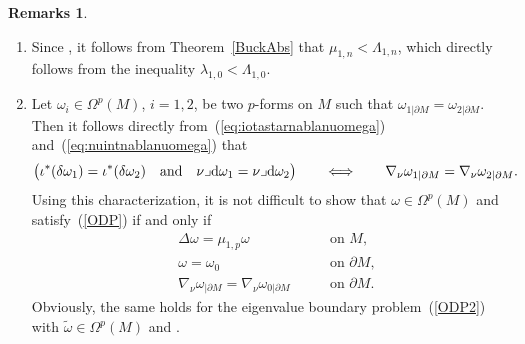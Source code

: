 \documentclass[pdftex]{sigma}
\numberwithin{equation}{section}
\theoremstyle{definition}
\newtheorem{Remarks}[Theorem]{Remarks}
\begin{document}
\begin{Remarks}\label{r:Schifferreformulated}
\noindent\begin{enumerate}\itemsep=0pt
\item Since , it follows from Theorem~\ref{BuckAbs} that $\mu_{1,n}<\Lambda_{1,n}$, which directly follows from the inequality $\lambda_{1,0}<\Lambda_{1,0}$.
\item Let $\omega_i\in\Omega^p(M)$, $i=1,2$, be two $p$-forms on $M$ such that $\omega_{1|\partial M}=\omega_{2|\partial M}$. Then it follows directly from~(\ref{eq:iotastarnablanuomega}) and~(\ref{eq:nuintnablanuomega}) that
\[
\bigl(\iota^*(\delta\omega_1)=\iota^*(\delta\omega_2)\quad\text{and}\quad\nu\lrcorner {\rm d}\omega_1=\nu\lrcorner {\rm d}\omega_2\bigr)\qquad\Longleftrightarrow\qquad\nabla_\nu\omega_{1|\partial M}=\nabla_\nu\omega_{2|\partial M}.
\]
Using this characterization, it is not difficult to show that $\omega\in\Omega^p(M)$ and  satisfy~(\ref{ODP}) if and only if
\[
\begin{aligned}
&\Delta \omega =\mu_{1,p} \omega \ \quad &&\textrm{on } M, \\
&\omega = \omega_0\ \quad && \textrm{on }\partial M, \\
&\nabla_\nu\omega_{|\partial M} = \nabla_\nu\omega_{0|\partial M}\ \quad &&\textrm{on }\partial M.
\end{aligned}
\]
Obviously, the same holds for the eigenvalue boundary problem~(\ref{ODP2}) with $\widetilde{\omega}\in\Omega^p(M)$ and .
\end{enumerate}
\end{Remarks}
\end{document}
